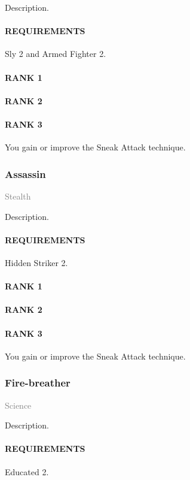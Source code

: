 \normalsize
Description.
\paragraph{REQUIREMENTS} Sly 2 and Armed Fighter 2.
\paragraph{RANK 1} 
\paragraph{RANK 2} 
\paragraph{RANK 3} You gain or improve the Sneak Attack technique.

\subsubsection{Assassin} \label{tal::assassin} %
\small{\textcolor{gray}{Stealth}}

\normalsize
Description.
\paragraph{REQUIREMENTS} Hidden Striker 2.
\paragraph{RANK 1} 
\paragraph{RANK 2} 
\paragraph{RANK 3} You gain or improve the Sneak Attack technique.

\subsubsection{Fire-breather} \label{tal::firebreather}
\small{\textcolor{gray}{Science}}

\normalsize
Description.
\paragraph{REQUIREMENTS} Educated 2.
